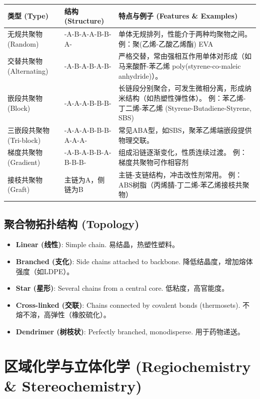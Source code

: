 \documentclass[12pt,a4paper]{ctexart}
\begin{document}
\begin{longtable}{p{4cm}p{5cm}p{5cm}}
\toprule
\textbf{类型 (Type)} & \textbf{结构 (Structure)} & \textbf{特点与例子 (Features \& Examples)} \\
\midrule
无规共聚物 (Random) & -A-B-A-A-B-B-A- & 单体无规排列，性能介于两种均聚物之间。  
例：聚(乙烯-乙酸乙烯酯) EVA \\
交替共聚物 (Alternating) & -A-B-A-B-A-B- & 严格交替，常由强相互作用单体对形成（如马来酸酐-苯乙烯 poly(styrene-co-maleic anhydride)）。  \\
嵌段共聚物 (Block) & -A-A-A-B-B-B- & 长链段分别聚合，可发生微相分离，形成纳米结构（如热塑性弹性体）。  
例：苯乙烯-丁二烯-苯乙烯 (Styrene-Butadiene-Styrene, SBS) \\
三嵌段共聚物 (Tri-block) & -A-A-A-B-B-B-A-A-A- & 常见ABA型，如SBS，聚苯乙烯端嵌段提供物理交联。 \\
梯度共聚物 (Gradient) & -A-B-A-B-B-A-B-B-B- & 组成沿链逐渐变化，性质连续过渡。  
例：梯度共聚物可作相容剂 \\
接枝共聚物 (Graft) & 主链为A，侧链为B & 主链-支链结构，冲击改性剂常用。  
例：ABS树脂（丙烯腈-丁二烯-苯乙烯接枝共聚物） \\
\bottomrule
\end{longtable}

\subsection{聚合物拓扑结构 (Topology)}
\begin{itemize}
    \item \textbf{Linear (线性)}: Simple chain. 易结晶，热塑性塑料。
    \item \textbf{Branched (支化)}: Side chains attached to backbone. 降低结晶度，增加熔体强度（如LDPE）。
    \item \textbf{Star (星形)}: Several chains from a central core. 低粘度，高官能度。
    \item \textbf{Cross-linked (交联)}: Chains connected by covalent bonds (thermosets). 不熔不溶，高弹性（橡胶硫化）。
    \item \textbf{Dendrimer (树枝状)}: Perfectly branched, monodisperse. 用于药物递送。
\end{itemize}

\section{区域化学与立体化学 (Regiochemistry \& Stereochemistry)}
\end{document}
